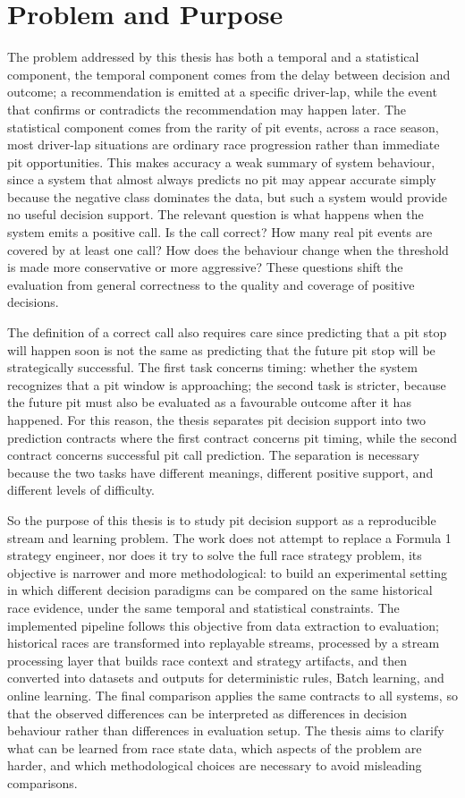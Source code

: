 \section{Problem and Purpose}

The problem addressed by this thesis has both a temporal and a statistical component, the temporal component comes from the delay between decision and outcome; a
recommendation is emitted at a specific driver-lap, while the event that confirms or contradicts the recommendation may happen later. The statistical component comes
from the rarity of pit events, across a race season, most driver-lap situations are ordinary race progression rather than immediate pit opportunities.
This makes accuracy a weak summary of system behaviour, since a system that almost always predicts no pit may appear accurate simply because the negative class dominates the data,
but such a system would provide no useful decision support. The relevant question is what happens when the system emits a positive call. Is the call correct? How many real
pit events are covered by at least one call? How does the behaviour change when the threshold is made more conservative or more aggressive? These questions shift the
evaluation from general correctness to the quality and coverage of positive decisions.

The definition of a correct call also requires care since predicting that a pit stop will happen soon is not the same as predicting that the future pit stop will be strategically
successful. The first task concerns timing: whether the system recognizes that a pit window is approaching; the second task is stricter, because the future pit must also
be evaluated as a favourable outcome after it has happened.
For this reason, the thesis separates pit decision support into two prediction contracts where the first contract concerns pit timing, while the second contract concerns successful
pit call prediction. The separation is necessary because the two tasks have different meanings, different positive support, and different levels of difficulty.

So the purpose of this thesis is to study pit decision support as a reproducible stream and learning problem. The work does not attempt to replace a Formula 1 strategy
engineer, nor does it try to solve the full race strategy problem, its objective is narrower and more methodological: to build an experimental setting in which different
decision paradigms can be compared on the same historical race evidence, under the same temporal and statistical constraints.
The implemented pipeline follows this objective from data extraction to evaluation; historical races are transformed into replayable streams, processed by a stream processing
layer that builds race context and strategy artifacts, and then converted into datasets and outputs for deterministic rules, Batch learning, and online learning. The final
comparison applies the same contracts to all systems, so that the observed differences can be interpreted as differences in decision behaviour rather than differences
in evaluation setup.
The thesis aims to clarify what can be learned from race state data, which aspects
of the problem are harder, and which methodological choices are necessary to avoid misleading comparisons. 

